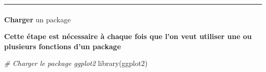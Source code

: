 \documentclass[
  french,
  10pt,
  a4paper,
]{article}
\makeatletter
\let\oldparagraph\paragraph
\renewcommand{\paragraph}{
    \@ifstar
      \xxxParagraphStar
      \xxxParagraphNoStar
  }
\newcommand{\xxxParagraphStar}[1]{\oldparagraph*{#1}\mbox{}}
\newcommand{\xxxParagraphNoStar}[1]{\oldparagraph{#1}\mbox{}}
\newenvironment{Shaded}{}{}
\newcommand{\CommentTok}[1]{\textcolor[rgb]{0.63,0.63,0.65}{\textit{#1}}}
\newcommand{\FunctionTok}[1]{\textcolor[rgb]{0.25,0.47,0.95}{#1}}
\newcommand{\NormalTok}[1]{\textcolor[rgb]{0.22,0.23,0.26}{#1}}
\makeatother
\begin{document}
\begin{center}\rule{0.5\linewidth}{0.5pt}\end{center}

\paragraph{\texorpdfstring{\textbf{Charger} un
package}{Charger un package}}\label{charger-un-package}

\textbf{Cette étape est nécessaire à chaque fois que l'on veut utiliser
une ou plusieurs fonctions d'un package}

\begin{Shaded}
\begin{Highlighting}[]
\CommentTok{\# Charger le package ggplot2}
\FunctionTok{library}\NormalTok{(ggplot2)}
\end{Highlighting}
\end{Shaded}
\end{document}
